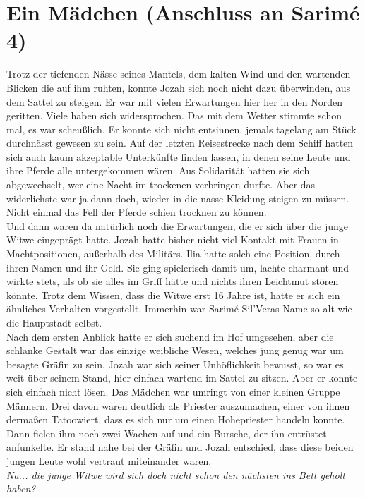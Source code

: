 \chapter{Ein Mädchen (Anschluss an Sarimé 4)}

Trotz der tiefenden Nässe seines Mantels, dem kalten Wind und den wartenden Blicken die auf ihm 
ruhten, konnte Jozah sich noch nicht dazu überwinden, aus dem Sattel zu steigen. Er war mit vielen 
Erwartungen hier her in den Norden geritten. Viele haben sich widersprochen. Das mit dem Wetter 
stimmte schon mal, es war scheußlich. Er konnte sich nicht entsinnen, jemals tagelang am Stück 
durchnässt gewesen zu sein. Auf der letzten Reisestrecke nach dem Schiff hatten sich auch kaum 
akzeptable Unterkünfte finden lassen, in denen seine Leute und ihre Pferde alle untergekommen 
wären. Aus Solidarität hatten sie sich abgewechselt, wer eine Nacht im trockenen verbringen durfte. 
Aber das widerlichste war ja dann doch, wieder in die nasse Kleidung steigen zu müssen. Nicht 
einmal das Fell der Pferde schien trocknen zu können.\\
Und dann waren da natürlich noch die Erwartungen, die er sich über die junge Witwe eingeprägt 
hatte. Jozah hatte bisher nicht viel Kontakt mit Frauen in Machtpositionen, außerhalb des Militärs. 
Ilia hatte solch eine Position, durch ihren Namen und ihr Geld. Sie ging spielerisch damit um, 
lachte charmant und wirkte stets, als ob sie alles im Griff hätte und nichts ihren Leichtmut stören 
könnte. Trotz dem Wissen, dass die Witwe erst 16 Jahre ist, hatte er sich ein ähnliches Verhalten 
vorgestellt. Immerhin war Sarimé Sil'Veras Name so alt wie die Hauptstadt selbst.\\
Nach dem ersten Anblick hatte er sich suchend im Hof umgesehen, aber die schlanke Gestalt war das 
einzige weibliche Wesen, welches jung genug war um besagte Gräfin zu sein. Jozah war sich seiner 
Unhöflichkeit bewusst, so war es weit über seinem Stand, hier einfach wartend im Sattel zu sitzen. 
Aber er konnte sich einfach nicht lösen. Das Mädchen war umringt von einer kleinen Gruppe Männern. 
Drei davon waren deutlich als Priester auszumachen, einer von ihnen dermaßen Tatoowiert, dass es 
sich nur um einen Hohepriester handeln konnte. Dann fielen ihm noch zwei Wachen auf und ein 
Bursche, der ihn entrüstet anfunkelte. Er stand nahe bei der Gräfin und Jozah entschied, dass diese 
beiden jungen Leute wohl vertraut miteinander waren.\\
\textit{Na... die junge Witwe wird sich doch nicht schon den nächsten ins Bett geholt haben?}\\
